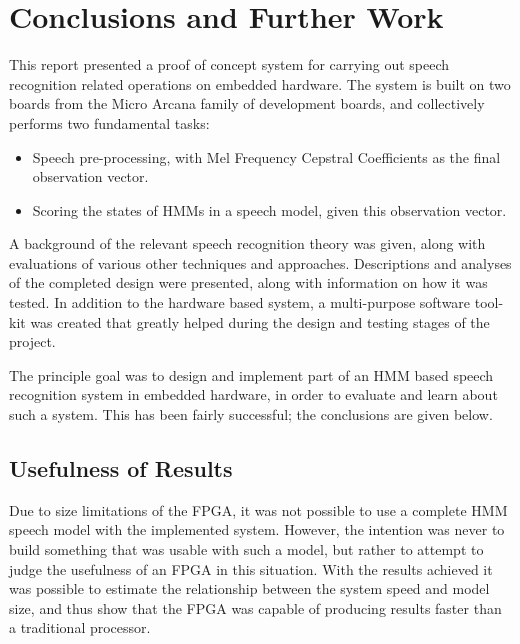 \chapter{Conclusions and Further Work} %
\label{cha:conclusions_and_future_work}


This report presented a proof of concept system for carrying out speech recognition related operations on embedded hardware.  The system is built on two boards from the Micro Arcana family of development boards, and collectively performs two fundamental tasks:
\begin{itemize}
	\item Speech pre-processing, with Mel Frequency Cepstral Coefficients as the final observation vector.
	\item Scoring the states of HMMs in a speech model, given this observation vector.
\end{itemize}

A background of the relevant speech recognition theory was given, along with evaluations of various other techniques and approaches.  Descriptions and analyses of the completed design were presented, along with information on how it was tested.  In addition to the hardware based system, a multi-purpose software tool-kit was created that greatly helped during the design and testing stages of the project.

The principle goal was to design and implement part of an HMM based speech recognition system in embedded hardware, in order to evaluate and learn about such a system.  This has been fairly successful; the conclusions are given below.


\section{Usefulness of Results} %
\label{sec:usefulness}
	Due to size limitations of the FPGA, it was not possible to use a complete HMM speech model with the implemented system.  However, the intention was never to build something that was usable with such a model, but rather to attempt to judge the usefulness of an FPGA in this situation.  With the results achieved it was possible to estimate the relationship between the system speed and model size, and thus show that the FPGA was capable of producing results faster than a traditional processor.


